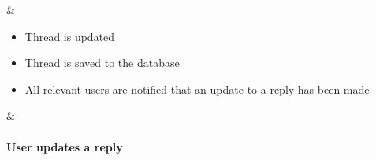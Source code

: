\documentclass{article}
\begin{document}
\begin{table}
\begin{tabularx}{\textwidth}
\begin{itemize}
					
					
				\end{itemize} &
				\begin{itemize}
					\item Thread is updated
					\item Thread is saved to the database
						\item All relevant users are notified that an update to a reply has been made
					
					
					
				\end{itemize} &
				\paragraph{User updates a reply}
				\\
				\hline
	

	\end{tabularx}
\end{table}
\newpage
\end{document}
